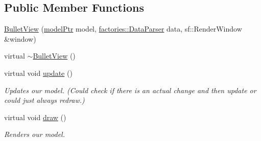 \subsection*{\-Public \-Member \-Functions}
\begin{DoxyCompactItemize}
\item 
\hyperlink{classviews_1_1BulletView_aa0a2f2e62f057691f39aa14d90fbbbd1}{\-Bullet\-View} (\hyperlink{ModelView_8h_a78966ddb517fca8d2b29a2bc5c31e74e}{model\-Ptr} model, \hyperlink{classfactories_1_1DataParser}{factories\-::\-Data\-Parser} data, sf\-::\-Render\-Window \&window)
\item 
virtual \hyperlink{classviews_1_1BulletView_a1d0375266600294d5e3824a74213c938}{$\sim$\-Bullet\-View} ()
\item 
virtual void \hyperlink{classviews_1_1BulletView_af144914d620bdbb47dc7165c1c270064}{update} ()
\begin{DoxyCompactList}\small\item\em \-Updates our model. (\-Could check if there is an actual change and then update or could just always redraw.) \end{DoxyCompactList}\item 
virtual void \hyperlink{classviews_1_1BulletView_a3013f3aacf75ad108902a9117126dba4}{draw} ()
\begin{DoxyCompactList}\small\item\em \-Renders our model. \end{DoxyCompactList}\end{DoxyCompactItemize}


